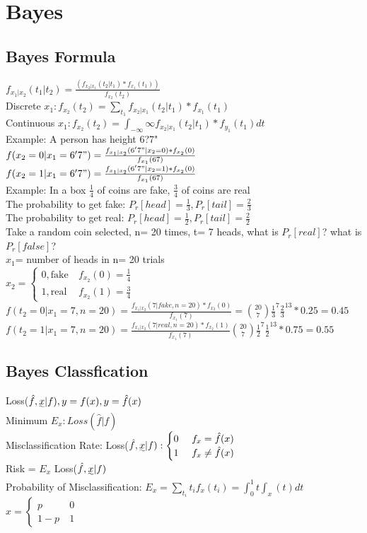 \documentclass{article}
\begin{document}
\section{Bayes} 
\subsection{Bayes Formula} 
$f_{x_1|x_2}(t_1|t_2)= \frac{ (f_{x_2|x_1}(t_2|t_1)*f_{x_1}(t_1))} {f_{x_2}(t_2)}$
\\Discrete $x_1: f_{x_2}(t_2)= \sum_{t_1}f_{x_2|x_1}(t_2|t_1)*f_{x_1}(t_1)$
\\Continuous $x_1: f_{x_2}(t_2)= \int_{-\infty}{\infty}f_{x_2|x_1}(t_2|t_1)*f_{y_1}(t_1)dt$
\\Example: A person has height 6?7"
\\$f(x_2= 0| x_1=6'7")=\frac{ f_{x_1|x_2}(6'7"|x_2= 0)*f_{x_2}(0)}{f_{x_1}(67)}$
\\$f(x_2= 1| x_1=6'7")=\frac{ f_{x_1|x_2}(6'7"|x_2= 1)*f_{x_2}(0)}{f_{x_1}(67)}$
\\Example: In a box $\frac{1}{4}$ of coins are fake, $\frac{3}{4} $ of coins are real
\\The probability to get fake: $P_r[head]= \frac{1}{3}, P_r[tail]= \frac{2}{3} $
\\The probability to get real: $P_r[head]= \frac{1}{2}, P_r[tail]= \frac{2}{2} $
\\Take a random coin selected, n= 20 times, t= 7 heads, what is $P_r[real]$? what is $P_r[false]$?
\\$x_1$= number of heads in n= 20 trials
\\$x_2= \begin{cases} 0, \text{fake}  &\  f_{x_2}(0)=\frac{1}{4} \\ 
	1, \text{real}  &\  f_{x_2}(1)=\frac{3}{4} \end{cases}$
\\$f(t_2= 0| x_1=7, n= 20)=\frac{f_{x_1|x_2}(7|fake, n= 20)*f_{x_2}(0)}{f_{x_1}(7)}= {20\choose 7}\frac{1}{3}^7\frac{2}{3}^13*0.25=0.45$
\\$f(t_2= 1|x_1=7, n= 20)=\frac{ f_{x_1|x_2}(7|real, n= 20)*f_{x_2}(1)}{f_{x_1}(7)}{20\choose 7}\frac{1}{2}^7\frac{1}{2}^13*0.75=0.55$	

\subsection{Bayes Classfication} 	
Loss($\hat{f}, \uwave{x}|f), y=f(x), y=\hat{f}(x)$ 
\\Minimum $E_x: Loss (\hat{f}|f)$
\\Misclassification Rate: Loss($\hat{f}, \uwave{x}|f): \begin{cases} 0 &\   f_x=\hat{f}(x) \\ 
	1 &\  f_x \ne \hat{f}(x) \end{cases}$
\\Risk = $E_x$ Loss($\hat{f}, \uwave{x}|f)$
\\Probability of Misclassification: $E_x= \sum_{t_i}t_if_x(t_i)= \int_{0}^{1}t\int_{x}(t)dt$
\\$x= \begin{cases} p  &\ 0 \\ 
	1-p &\ 1 \end{cases}$
	
\end{document}
